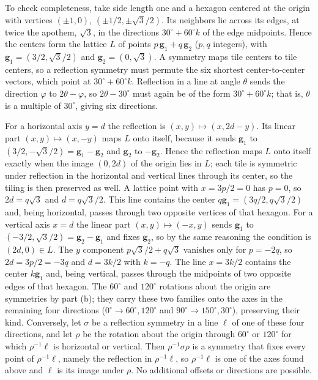 To check completeness, take side length one and a hexagon centered
at the origin with vertices $(\pm1,0)$, $(\pm1/2,\pm\sqrt3/2)$.
Its neighbors lie across its edges, at twice the apothem, $\sqrt3$,
in the directions $30^\circ+60^\circ k$ of the edge midpoints.
Hence the centers form the lattice $L$ of points
$p\,\mathbf g_1+q\,\mathbf g_2$ ($p,q$ integers), with
$\mathbf g_1=(3/2,\sqrt3/2)$ and $\mathbf g_2=(0,\sqrt3)$.
A symmetry maps tile centers to tile centers, so a reflection
symmetry must permute the six shortest center-to-center vectors,
which point at $30^\circ+60^\circ k$. Reflection in a line at angle
$\theta$ sends the direction $\varphi$ to $2\theta-\varphi$, so
$2\theta-30^\circ$ must again be of the form $30^\circ+60^\circ k$;
that is, $\theta$ is a multiple of $30^\circ$, giving six directions.

For a horizontal axis $y=d$ the reflection is
$(x,y)\mapsto(x,2d-y)$. Its linear part $(x,y)\mapsto(x,-y)$
maps $L$ onto itself, because it sends $\mathbf g_1$ to
$(3/2,-\sqrt3/2)=\mathbf g_1-\mathbf g_2$ and $\mathbf g_2$ to $-\mathbf g_2$.
Hence the reflection maps $L$ onto itself exactly when the image
$(0,2d)$ of the origin lies in $L$; each tile is symmetric under
reflection in the horizontal and vertical lines through its center,
so the tiling is then preserved as well. A lattice point with
$x=3p/2=0$ has $p=0$, so $2d=q\sqrt3$ and $d=q\sqrt3/2$.
This line contains the center $q\mathbf g_1=(3q/2,q\sqrt3/2)$ and,
being horizontal, passes through two opposite vertices of that
hexagon. For a vertical axis $x=d$ the linear part
$(x,y)\mapsto(-x,y)$ sends $\mathbf g_1$ to
$(-3/2,\sqrt3/2)=\mathbf g_2-\mathbf g_1$ and fixes $\mathbf g_2$,
so by the same reasoning the condition is $(2d,0)\in L$.
The $y$ component $p\sqrt3/2+q\sqrt3$ vanishes only for $p=-2q$,
so $2d=3p/2=-3q$ and $d=3k/2$ with $k=-q$. The line $x=3k/2$
contains the center $k\mathbf g_1$ and, being vertical, passes
through the midpoints of two opposite edges of that hexagon.
The $60^\circ$ and $120^\circ$ rotations about the origin are
symmetries by part (b); they carry these two families onto the axes
in the remaining four directions ($0^\circ\to60^\circ,120^\circ$ and
$90^\circ\to150^\circ,30^\circ$), preserving their kind.
Conversely, let $\sigma$ be a reflection symmetry in a line $\ell$ of
one of these four directions, and let $\rho$ be the rotation about the
origin through $60^\circ$ or $120^\circ$ for which $\rho^{-1}\ell$ is
horizontal or vertical. Then $\rho^{-1}\sigma\rho$ is a symmetry that
fixes every point of $\rho^{-1}\ell$, namely the reflection in
$\rho^{-1}\ell$, so $\rho^{-1}\ell$ is one of the axes found above and
$\ell$ is its image under $\rho$.
No additional offsets or directions are possible.

